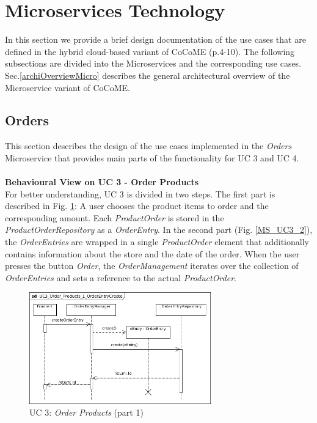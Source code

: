 	

	
\section{Microservices Technology} \label{MS}
	In this section we provide a brief design documentation of the use cases that are defined in the hybrid cloud-based variant of CoCoME \cite{herold2008}(p.4-10).
	The following subsections are divided into the Microservices and the corresponding use cases. Sec.\ref{archiOverviewMicro} describes the general architectural overview of the Microservice variant of CoCoME.
	

	

	\FloatBarrier
		\subsection{Orders}
		This section describes the design of the use cases implemented in the \textit{Orders} Microservice that provides main parts of the functionality for UC 3 and UC 4.\\
		\noindent
		\\
		\textbf{Behavioural View on UC 3 - Order Products} \\
		For better understanding, UC 3 is divided in two steps. The first part is described in Fig. \ref{MS_UC3_1}: A user chooses the product items to order and the corresponding amount. Each \textit{ProductOrder} is stored in the \textit{ProductOrderRepository} as a \textit{OrderEntry}. In the second part (Fig. \ref{MS_UC3_2}), the  \textit{OrderEntries} are wrapped in a single \textit{ProductOrder} element that additionally contains information about the store and the date of the order. When the user presses the button \textit{Order}, the \textit{OrderManagement} iterates over the collection of \textit{OrderEntries} and sets a reference to the actual \textit{ProductOrder}.
	

		
			\begin{figure}[!h]
				\centering
				\includegraphics[width = 0.7\textwidth]{img/UC3_Order_Products_1_OrderEntryCreate.jpg}
				\caption{UC 3: \textit{Order Products} (part 1)}
				\label{MS_UC3_1}
			\end{figure}
			
